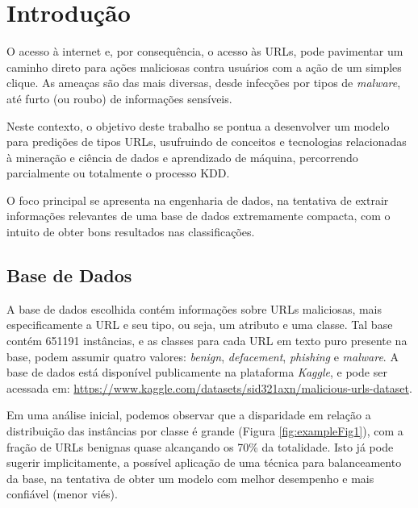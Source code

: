 \documentclass[a4paper, 12pt]{article}
\begin{document}
\tableofcontents
\newpage

\section{Introdução}

O acesso à internet e, por consequência, o acesso às URLs, pode pavimentar um caminho direto para ações maliciosas contra usuários com a ação de um simples clique. As ameaças são das mais diversas, desde infecções por tipos de \emph{malware}, até furto (ou roubo) de informações sensíveis.

Neste contexto, o objetivo deste trabalho se pontua a desenvolver um modelo para predições de tipos URLs, usufruindo de conceitos e tecnologias relacionadas à mineração e ciência de dados e aprendizado de máquina, percorrendo parcialmente ou totalmente o processo KDD. 

O foco principal se apresenta na engenharia de dados, na tentativa de extrair informações relevantes de uma base de dados extremamente compacta, com o intuito de obter bons resultados nas classificações.

\subsection{Base de Dados}

A base de dados escolhida contém informações sobre URLs maliciosas, mais especificamente a URL e seu tipo, ou seja, um atributo e uma classe. Tal base contém 651191 instâncias, e as classes para cada URL em texto puro presente na base, podem assumir quatro valores: \emph{benign}, \emph{defacement}, \emph{phishing} e \emph{malware}. A base de dados está disponível publicamente na plataforma \emph{Kaggle}, e pode ser acessada em: \url{https://www.kaggle.com/datasets/sid321axn/malicious-urls-dataset}.

Em uma análise inicial, podemos observar que a disparidade em relação a distribuição das instâncias por classe é grande (Figura \ref{fig:exampleFig1}), com a fração de URLs benignas quase alcançando os 70\% da totalidade. Isto já pode sugerir implicitamente, a possível aplicação de uma técnica para balanceamento da base, na tentativa de obter um modelo com melhor desempenho e mais confiável (menor viés).
\end{document}
